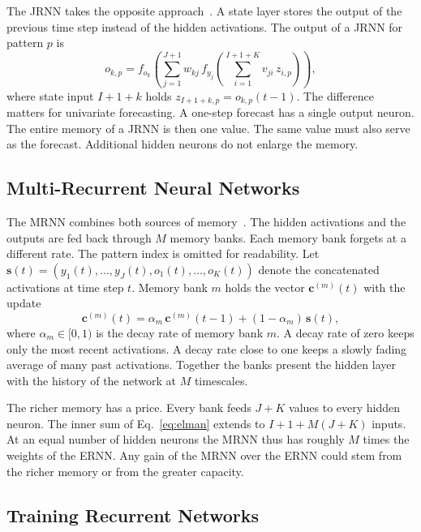 \documentclass[conference,10pt]{IEEEtran}
\begin{document}
The JRNN takes the opposite approach~\cite{jordan1986}.
A state layer stores the output of the previous time step instead of
the hidden activations.
The output of a JRNN for pattern $p$ is
\begin{equation}
o_{k,p} = f_{o_k}\!\left(\sum_{j=1}^{J+1} w_{kj}\,
  f_{y_j}\!\left(\sum_{i=1}^{I+1+K} v_{ji}\, z_{i,p}\right)\right),
\label{eq:jordan}
\end{equation}
where state input $I+1+k$ holds $z_{I+1+k,p} = o_{k,p}(t-1)$.
The difference matters for univariate forecasting.
A one-step forecast has a single output neuron.
The entire memory of a JRNN is then one value.
The same value must also serve as the forecast.
Additional hidden neurons do not enlarge the memory.

\subsection{Multi-Recurrent Neural Networks}

The MRNN combines both sources of memory~\cite{ulbricht1994}.
The hidden activations and the outputs are fed back through $M$ memory
banks.
Each memory bank forgets at a different rate.
The pattern index is omitted for readability.
Let $\mathbf{s}(t) = (y_1(t), \ldots, y_J(t), o_1(t), \ldots, o_K(t))$
denote the concatenated activations at time step $t$.
Memory bank $m$ holds the vector $\mathbf{c}^{(m)}(t)$ with the update
\begin{equation}
\mathbf{c}^{(m)}(t) = \alpha_m\, \mathbf{c}^{(m)}(t-1)
  + (1-\alpha_m)\, \mathbf{s}(t),
\label{eq:mrnn}
\end{equation}
where $\alpha_m \in [0,1)$ is the decay rate of memory bank $m$.
A decay rate of zero keeps only the most recent activations.
A decay rate close to one keeps a slowly fading average of many past
activations.
Together the banks present the hidden layer with the history of the
network at $M$ timescales.

The richer memory has a price.
Every bank feeds $J+K$ values to every hidden neuron.
The inner sum of Eq.~\eqref{eq:elman} extends to $I+1+M(J+K)$ inputs.
At an equal number of hidden neurons the MRNN thus has roughly $M$ times
the weights of the ERNN.
Any gain of the MRNN over the ERNN could stem from the richer memory or
from the greater capacity.

\subsection{Training Recurrent Networks}
\end{document}
